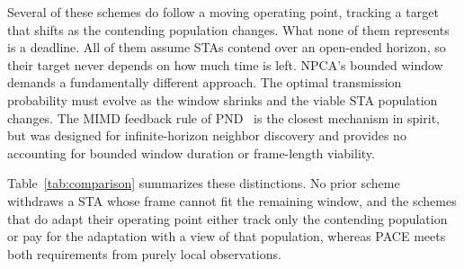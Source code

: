 \documentclass[a4paper,fleqn]{cas-dc}
\begin{document}
Several of these schemes do follow a moving operating point, tracking a
target that shifts as the contending population changes. What none of them
represents is a deadline. All of them assume STAs contend over an
open-ended horizon, so their target never depends on how much time is left.
NPCA's bounded window demands a fundamentally different approach. The
optimal transmission probability must evolve as the window shrinks and the
viable STA population changes. The MIMD feedback rule of PND~\citep{song2014pnd} is
the closest mechanism in spirit, but was designed for infinite-horizon
neighbor discovery and provides no accounting for bounded window duration
or frame-length viability.

Table~\ref{tab:comparison} summarizes these distinctions. No prior scheme
withdraws a STA whose frame cannot fit the remaining window, and the schemes
that do adapt their operating point either track only the contending
population or pay for the adaptation with a view of that population, whereas
PACE meets both requirements from purely local observations.
\end{document}
